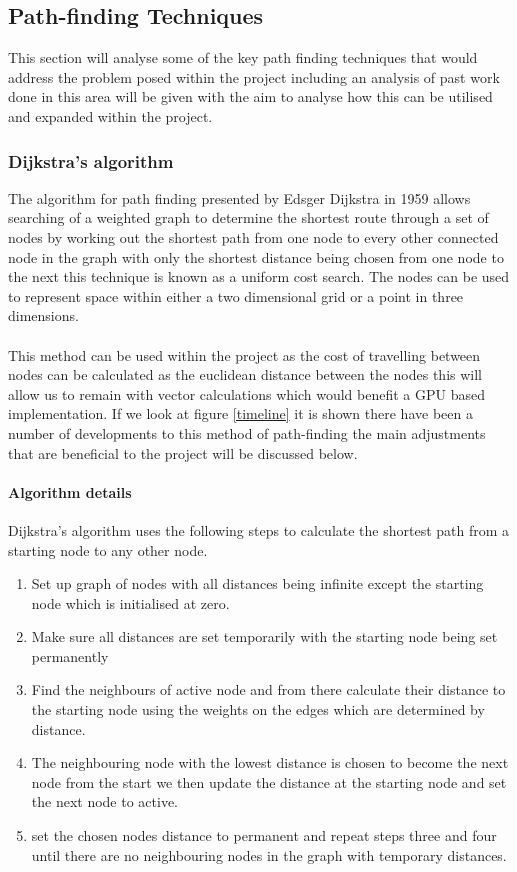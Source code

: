 \subsection{Path-finding Techniques}
This section will analyse some of the key path finding techniques that would address the problem posed within the project including an analysis of past work done in this area will be given with the aim to analyse how this can be utilised and expanded within the project. 
\subsubsection{Dijkstra's algorithm}
The algorithm for path finding presented by Edsger Dijkstra in 1959 \cite{dijkstra} allows searching of a weighted graph to determine the shortest route through a set of nodes by working out the shortest path from one node to every other connected node in the graph with only the shortest distance being chosen from one node to the next this technique is known as a uniform cost search. The nodes can be used to represent space within either a two dimensional grid or a point in three dimensions.\\\\ This method can be used within the project as the cost of travelling between nodes can be calculated as the euclidean distance between the nodes this will allow us to remain with vector calculations which would benefit a GPU based implementation. If we look at figure \ref{timeline} it is shown there have been a number of developments to this method of path-finding the main adjustments that are beneficial to the project will be discussed below.
\paragraph{Algorithm details}
Dijkstra's algorithm uses the following steps to calculate the shortest path from a starting node to any other node.

\begin{enumerate}
	\item Set up graph of nodes with all distances being infinite except the starting node which is initialised at zero.
	\item Make sure all distances are set temporarily with the starting node being set permanently
	\item Find the neighbours of active node and from there calculate their distance to the starting node using the weights on the edges which are determined by distance.
	\item The neighbouring node with the lowest distance is chosen to become the next node from the start we then update the distance at the starting node and set the next node to active.
	\item set the chosen nodes distance to permanent and repeat steps three and four until there are no neighbouring nodes in the graph with temporary distances.      
\end{enumerate}
 
